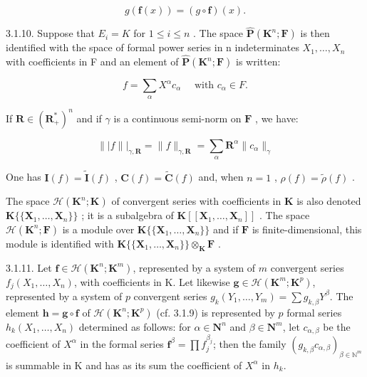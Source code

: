 \[
g (\mathbf {f} (x)) = (g \circ \mathbf {f}) (x).
\]

3.1.10. Suppose that \(E_{i} = K\) for \(1 \leqslant i \leqslant n\) . The space \(\hat{\mathbf{P}}(\mathbf{K}^{n}; \mathbf{F})\) is then identified with the space of formal power series in n indeterminates \(X_{1}, \ldots, X_{n}\) with coefficients in F and an element of \(\hat{\mathbf{P}}(\mathbf{K}^{n};\mathbf{F})\) is written:

\[
f = \sum_ {\alpha} X ^ {\alpha} c _ {\alpha} \quad \text {   with   } c _ {\alpha} \in F.
\]

If \(\mathbf{R} \in (\mathbf{R}_{+}^{*})^{n}\) and if \(\gamma\) is a continuous semi-norm on \(\mathbf{F}\) , we have:

\[
\| | f \| | _ {\gamma , \mathbf {R}} = \| f \| _ {\gamma , \mathbf {R}} = \sum_ {\alpha} \mathbf {R} ^ {\alpha} \| c _ {\alpha} \| _ {\gamma}
\]

One has \(\mathbf{I}(f) = \tilde{\mathbf{I}}(f)\) , \(\mathbf{C}(f) = \tilde{\mathbf{C}}(f)\) and, when \(n = 1\) , \(\rho(f) = \tilde{\rho}(f)\) .

The space \(\mathcal{H}(\mathbf{K}^{n};\mathbf{K})\) of convergent series with coefficients in \(\mathbf{K}\) is also denoted \(\mathbf{K}\{\{\mathbf{X}_{1},\ldots ,\mathbf{X}_{n}\}\}\) ; it is a subalgebra of \(\mathbf{K}[[\mathbf{X}_1,\dots ,\mathbf{X}_n]]\) . The space \(\mathcal{H}(\mathbf{K}^n;\mathbf{F})\) is a module over \(\mathbf{K}\{\{\mathbf{X}_1,\ldots ,\mathbf{X}_n\}\}\) and if \(\mathbf{F}\) is finite-dimensional, this module is identified with \(\mathbf{K}\{\{\mathbf{X}_1,\ldots ,\mathbf{X}_n\}\} \otimes_{\mathbf{K}}\mathbf{F}\) .

3.1.11. Let \(\mathbf{f} \in \mathcal{H}(\mathbf{K}^n; \mathbf{K}^m)\), represented by a system of \(m\) convergent series \(f_j(X_1, \ldots, X_n)\), with coefficients in K. Let likewise \(\mathbf{g} \in \mathcal{H}(\mathbf{K}^m; \mathbf{K}^p)\), represented by a system of \(p\) convergent series \(g_k(Y_1, \ldots, Y_m) = \sum g_{k,\beta} Y^\beta\). The element \(\mathbf{h} = \mathbf{g} \circ \mathbf{f}\) of \(\mathcal{H}(\mathbf{K}^n; \mathbf{K}^p)\) (cf. 3.1.9) is represented by \(p\) formal series \(h_k(X_1, \ldots, X_n)\) determined as follows: for \(\alpha \in \mathbf{N}^n\) and \(\beta \in \mathbf{N}^m\), let \(c_{\alpha,\beta}\) be the coefficient of \(X^\alpha\) in the formal series \(\mathbf{f}^\beta = \prod f_j^{\beta_j}\); then the family \((g_{k,\beta} c_{\alpha,\beta})_{\beta \in \mathbb{N}^m}\) is summable in K and has as its sum the coefficient of \(X^\alpha\) in \(h_k\).

